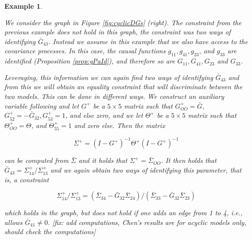 \documentclass[accepted]{uai2021} %
\newtheorem{exmp}[thm]{Example}
\begin{document}
\begin{exmp}
\begin{figure*}
\begin{subfigure}{0.48\linewidth}
		\end{subfigure}
		\caption{\label{fig:cyclicDGs} Loops (self-edges) are omitted from this 
		vizualiation. Circles represent observed coordinate processes and 
		squares represent unobserved processes. Left: . Right: }
	\end{figure*}
	
	We consider the graph in Figure \ref{fig:cyclicDGs} (right). The constraint 
	from the previous example does not hold in this graph, the constraint was 
	two ways of identifying $\bar{G}_{43}$. Instead we assume in 
	this example that we also have access to the 
	covariance processes. In this case, the causal functions 
	$g_{11},g_{41},g_{23}$, and $g_{33}$ are identified (Proposition 
	\ref{prop:gPaId}), and therefore so are $G_{11}, G_{41} , G_{23}$ and 
	$G_{33}$.
	
	Leveraging, this information we can again find two ways of identifying 
	$\bar{G}_{43}$ and from this we will obtain an equality constraint that 
	will 
	discriminate between the two models. This can be done in different ways. We 
	construct an {\it auxiliary 
	variable} following \cite{chenIJCAI2016, chenICML2017} and let $G^+$ be a 
	$5\times 5$ 
	matrix such that $G_{OO}^+ = \bar{G}$, $G_{52}^+ = -\bar{G}_{32}, G_{53}^+ 
	= 1$, and else zero, and we let $\Theta^+$ be a $5\times 5$ matrix such 
	that $\Theta_{OO}^+ = \Theta$, and $\Theta_{55}^+ = 1$ and zero else. Then 
	the matrix
	
	$$
	\Sigma^+ = (I - G^+)^{-1}\Theta^+(I-G^+)^{-1}
	$$
	
	can be computed from $\bar{\Sigma}$ and it holds that 
	$\Sigma^+=\bar{\Sigma}_{OO}$. It then holds that $\bar{G}_{43} = 
	\Sigma_{14}^+/\Sigma_{13}^+$ and we again obtain two ways of identifying 
	this parameter, that is, a constraint
	
	$$
	\Sigma_{14}^+/\Sigma_{13}^+ = (\bar{\Sigma}_{34} - 
	\bar{G}_{32}\bar{\Sigma}_{24})/(\bar{\Sigma}_{33} - 
	\bar{G}_{32}\bar{\Sigma}_{23})
	$$
	
	which holds in the graph, but does not hold if one adds an edge from 1 to 
	4, i.e., allows $\bar{G}_{41} \neq 0$. 
	[fix: add computations, Chen's results are for acyclic models only, should 
	check the computations]
\end{exmp}
\end{document}
